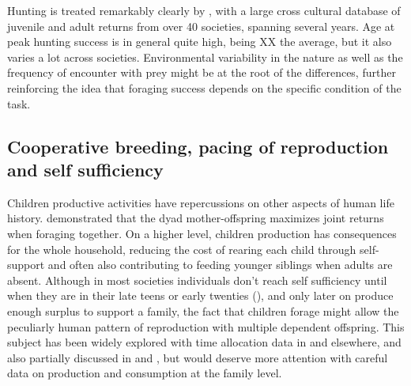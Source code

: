Hunting is treated remarkably clearly by \cite{koster_life_2020}, with a large cross cultural database of juvenile and adult returns from over 40 societies, spanning several years. Age at peak hunting success is in general quite high, being XX the average, but it also varies a lot across societies. Environmental variability in the nature as well as the frequency of encounter with prey might be at the root of the differences, further reinforcing the idea that foraging success depends on the specific condition of the task.






\subsection{Cooperative breeding, pacing of reproduction and self sufficiency}
Children productive activities have repercussions on other aspects of human life history. \cite{hawkes_hadza_1995} demonstrated that the dyad mother-offspring maximizes joint returns when foraging together. On a higher level, children production has consequences for the whole household, reducing the cost of rearing each child through self-support and often also contributing to feeding younger siblings when adults are absent. Although in most societies individuals don't reach self sufficiency until when they are in their late teens or early twenties (\cite{kaplan_evolution_1997}), and only later on produce enough surplus to support a family, the fact that children forage might allow the peculiarly human pattern of reproduction with multiple dependent offspring. This subject has been widely explored with time allocation data in \cite{kramer_variation_2002, kramer_maya_2005, kramer_childrens_2005, kramer_does_2009} and elsewhere, and also partially discussed in \cite{crittenden_juvenile_2013} and \cite{bird_constraints_2002}, but would deserve more attention with careful data on production and consumption at the family level. 

